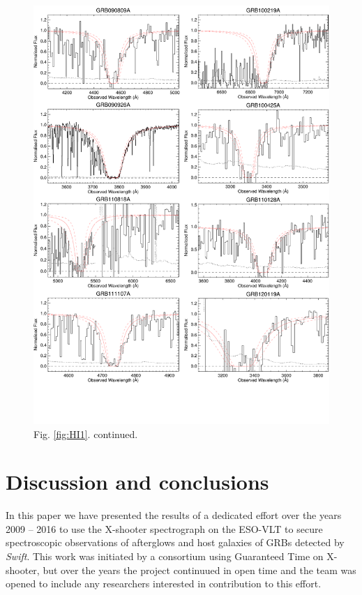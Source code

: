 \documentclass{aa}    %
\begin{document}
\begin{figure}
	\centering
	\includegraphics[page=5, width=16cm]{figures/HI_measurements.pdf}
	\caption*{Fig. \ref{fig:HI1}. continued.}
	\label{fig:HI5}
\end{figure}


\section{Discussion and conclusions}\label{conclusions}

In this paper we have presented the results of a dedicated effort over the
years 2009 -- 2016 to use the X-shooter spectrograph on the ESO-VLT to secure
spectroscopic observations of afterglows and host galaxies of GRBs detected by
{\it Swift}. This work was initiated by a consortium using Guaranteed Time on
X-shooter, but over the years the project continuued in open time and the team
was opened to include any researchers interested in contribution to this
effort.
\end{document}
